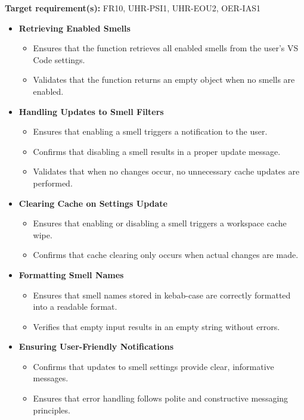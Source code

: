 \documentclass[12pt, titlepage]{article}
\begin{document}
\noindent \textbf{Target requirement(s):} FR10, UHR-PSI1, UHR-EOU2, OER-IAS1~\cite{SRS} \\

\begin{itemize}
    \item \textbf{Retrieving Enabled Smells}
    \begin{itemize}
        \item Ensures that the function retrieves all enabled smells from the user's VS Code settings.
        \item Validates that the function returns an empty object when no smells are enabled.
    \end{itemize}

    \item \textbf{Handling Updates to Smell Filters}
    \begin{itemize}
        \item Ensures that enabling a smell triggers a notification to the user.
        \item Confirms that disabling a smell results in a proper update message.
        \item Validates that when no changes occur, no unnecessary cache updates are performed.
    \end{itemize}

    \item \textbf{Clearing Cache on Settings Update}
    \begin{itemize}
        \item Ensures that enabling or disabling a smell triggers a workspace cache wipe.
        \item Confirms that cache clearing only occurs when actual changes are made.
    \end{itemize}

    \item \textbf{Formatting Smell Names}
    \begin{itemize}
        \item Ensures that smell names stored in kebab-case are correctly formatted into a readable format.
        \item Verifies that empty input results in an empty string without errors.
    \end{itemize}

    \item \textbf{Ensuring User-Friendly Notifications}
    \begin{itemize}
        \item Confirms that updates to smell settings provide clear, informative messages.
        \item Ensures that error handling follows polite and constructive messaging principles.
    \end{itemize}
\end{itemize}
\end{document}
